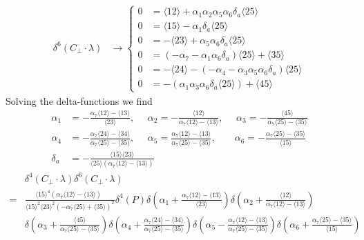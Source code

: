 \documentclass[letter,11pt]{article}
\newcommand{\ab}[1]{\langle #1 \rangle}
\begin{document}
\begin{equation}
	\begin{aligned}
				\delta^{6}(C_\perp\cdot \lambda)&\rightarrow\begin{cases} 0&=
		\langle 1 2 \rangle + \alpha_{1} \alpha_{2} \alpha_{5} \alpha_{6} \delta_a \langle 2 5 \rangle
		\\0&=
		\langle 1 5 \rangle - \alpha_{1} \delta_a \langle 2 5 \rangle
		\\0&=
		-\langle 2 3 \rangle + \alpha_{5} \alpha_{6} \delta_a \langle 2 5 \rangle
		\\0&=
		(-\alpha_{7} - \alpha_{1} \alpha_{6} \delta_a) \langle 2 5 \rangle + \langle 3 5 \rangle
		\\0&=
		-\langle 2 4 \rangle - (-\alpha_{4} - \alpha_{3} \alpha_{5} \alpha_{6} \delta_a) \langle 2 5 \rangle
		\\0&=
		-(\alpha_{1} \alpha_{3} \alpha_{6} \delta_a \langle 2 5 \rangle) + \langle 4 5 \rangle
				\end{cases}
	\end{aligned}
\end{equation}
Solving the delta-functions we find
\begin{equation}
	\begin{aligned}
		\alpha_1&=-\frac{
			\alpha_7\ab{12}-\ab{13}
		}{	\ab{23}},~~~~~~
		\alpha_2=-\frac{\ab{12}}{\alpha_7\ab{12}-\ab{13}},~~~~~~
		\alpha_3=-\frac{\ab{45}}{\alpha_7\ab{25}-\ab{35}}\\
		\alpha_4&=-\frac{\alpha_7\ab{24}-\ab{34}}{\alpha_7\ab{25}-\ab{35}}
		,~~~~~~
		\alpha_5=\frac{\alpha_7\ab{12}-\ab{13}}{\alpha_7\ab{25}-\ab{35}}
		,~~~~~~~~\,
		\alpha_6=-\frac{\alpha_7\ab{25}-\ab{35}}{\ab{15}}
		\\
		\delta_a&=-\frac{\ab{15}\ab{23}}{\ab{25}\left(\alpha_7\ab{12}-\ab{13}\right)}
	\end{aligned}
\end{equation}
\begin{equation}
	\begin{aligned}
		&\delta^{4}(C_\perp\cdot \lambda)\delta^{6}(C_\perp\cdot \lambda)\\
		=&
		\frac{\ab{15}^4\left(\alpha_7\ab{12}-\ab{13}\right)^{\phantom{2}}}{\ab{15}^2\ab{23}^2 \left(-\alpha_7\ab{25}+\ab{35}\right)^2}\delta^4( P)
		\delta\left(\alpha_1+\frac{
			\alpha_7\ab{12}-\ab{13}
		}{	\ab{23}}\right)
		\delta\left(\alpha_2+\frac{\ab{12}}{\alpha_7\ab{12}-\ab{13}}\right)\\&
		\delta\left(\alpha_3+\frac{\ab{45}}{\alpha_7\ab{25}-\ab{35}}\right)
		\delta\left(\alpha_4+\frac{\alpha_7\ab{24}-\ab{34}}{\alpha_7\ab{25}-\ab{35}}\right)
		\delta\left(\alpha_5-\frac{\alpha_7\ab{12}-\ab{13}}{\alpha_7\ab{25}-\ab{35}}\right)
		\delta\left(\alpha_6+\frac{\alpha_7\ab{25}-\ab{35}}{\ab{15}}\right)
	\end{aligned}
\end{equation}
\end{document}
